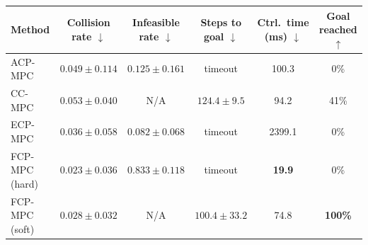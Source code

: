 \begin{tabular}{lccccc}
\hline
Method &
Collision rate $\downarrow$ &
Infeasible rate $\downarrow$ &
Steps to goal $\downarrow$ &
Ctrl.\ time (ms) $\downarrow$ &
Goal reached $\uparrow$ \\
\hline
ACP-MPC~\cite{dixit2023adaptive}
& $0.049\pm0.114$
& $0.125\pm0.161$
& timeout
& 100.3
& 0\% \\
CC-MPC~\cite{lekeufack2024decision}
& $0.053\pm0.040$
& N/A
& $124.4\pm9.5$
& 94.2
& 41\% \\
ECP-MPC~\cite{shin2025egocentric}
& $0.036\pm0.058$
& $\mathbf{0.082}\pm0.068$
& timeout
& 2399.1
& 0\% \\
FCP-MPC (hard)
& $\mathbf{0.023}\pm0.036$
& $0.833\pm0.118$
& timeout
& \textbf{19.9}
& 0\% \\
FCP-MPC (soft)
& $0.028\pm0.032$
& N/A
& $\mathbf{100.4}\pm33.2$
& 74.8
& \textbf{100\%} \\
\hline
\end{tabular}
